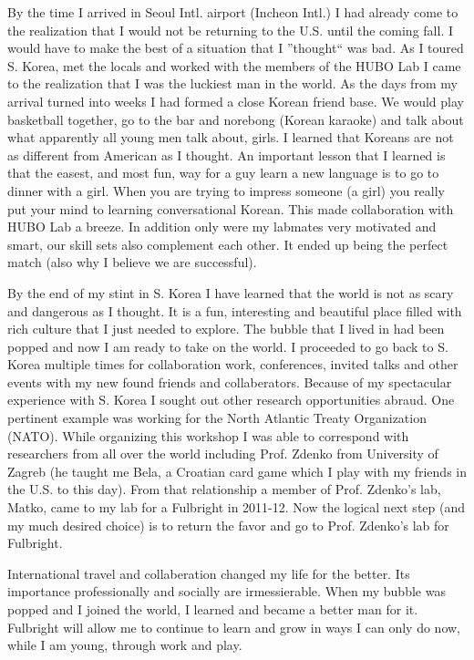 \documentclass[12pt]{article}
\begin{document}
	By the time I arrived in Seoul Intl. airport (Incheon Intl.) I had already come to the realization that I would not be returning to the U.S. until the coming fall.  
I would have to make the best of a situation that I ''thought`` was bad.  
As I toured S. Korea, met the locals and worked with the members of the HUBO Lab I came to the realization that I was the luckiest man in the world. 
 As the days from my arrival turned into weeks I had formed a close Korean friend base.
We would play basketball together, go to the bar and norebong (Korean karaoke) and talk about what apparently all young men talk about, girls.  
I learned that Koreans are not as different from American as I thought.
An important lesson that I learned is that the easest, and most fun, way for a guy learn a new language is to go to dinner with a girl.
When you are trying to impress someone (a girl) you really put your mind to learning conversational Korean.  
This made collaboration with HUBO Lab a breeze.  
In addition only were my labmates very motivated and smart, our skill sets also complement each other.  
It ended up being the perfect match (also why I believe we are successful).  



By the end of my stint in S. Korea I have learned that the world is not as scary and dangerous as I thought.
It is a fun, interesting and beautiful place filled with rich culture that I just needed to explore.
The bubble that I lived in had been popped and now I am ready to take on the world.  
I proceeded to go back to S. Korea multiple times for collaboration work, conferences, invited talks and other events with my new found friends and collaberators.  
Because of my spectacular experience with S. Korea I sought out other research opportunities abraud.  
One pertinent example was working for the North Atlantic Treaty Organization (NATO).
While organizing this workshop I was able to correspond with researchers from all over the world including Prof. Zdenko from University of Zagreb (he taught me Bela, a Croatian card game which I play with my friends in the U.S. to this day).  
From that relationship a member of Prof. Zdenko’s lab, Matko, came to my lab for a Fulbright in 2011-12.  
Now the logical next step (and my much desired choice) is to return the favor and go to Prof. Zdenko's lab for Fulbright.

International travel and collaberation changed my life for the better.
Its importance professionally and socially are irmessierable.
When my bubble was popped and I joined the world, I learned and became a better man for it.
Fulbright will allow me to continue to learn and grow in ways I can only do now, while I am young, through work and play.
\end{document}
